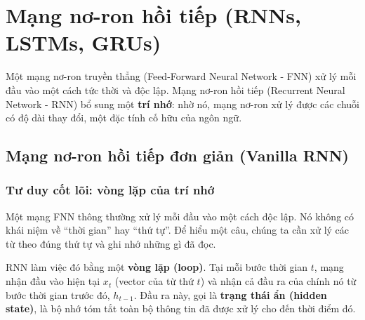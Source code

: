 
\section{Mạng nơ-ron hồi tiếp (RNNs, LSTMs, GRUs)}
\label{sec:rnns}

Một mạng nơ-ron truyền thẳng (Feed-Forward Neural Network - FNN) xử lý mỗi đầu vào một cách tức thời và độc lập. Mạng nơ-ron hồi tiếp (Recurrent Neural Network - RNN) bổ sung một \textbf{trí nhớ}: nhờ nó, mạng nơ-ron xử lý được các chuỗi có độ dài thay đổi, một đặc tính cố hữu của ngôn ngữ.

\subsection{Mạng nơ-ron hồi tiếp đơn giản (Vanilla RNN)}
\label{ssec:vanilla_rnn}

\subsubsection{Tư duy cốt lõi: vòng lặp của trí nhớ}
Một mạng FNN thông thường xử lý mỗi đầu vào một cách độc lập. Nó không có khái niệm về “thời gian” hay “thứ tự”. Để hiểu một câu, chúng ta cần xử lý các từ theo đúng thứ tự và ghi nhớ những gì đã đọc.

RNN làm việc đó bằng một \textbf{vòng lặp (loop)}. Tại mỗi bước thời gian $t$, mạng nhận đầu vào hiện tại $x_t$ (vector của từ thứ $t$) và nhận cả đầu ra của chính nó từ bước thời gian trước đó, $h_{t-1}$. Đầu ra này, gọi là \textbf{trạng thái ẩn (hidden state)}, là bộ nhớ tóm tắt toàn bộ thông tin đã được xử lý cho đến thời điểm đó.

\begin{center}
    \label{fig:rnn_unrolled}
\end{center}

